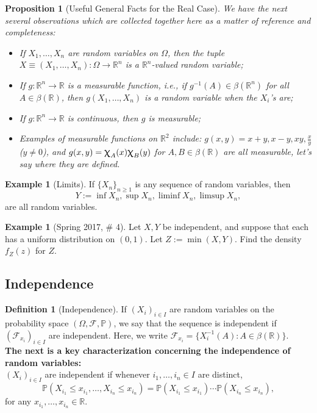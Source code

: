\documentclass[12pt,reqno]{article}
\theoremstyle{plain}
\newtheorem{prop}[theorem]{Proposition}
\theoremstyle{definition}
\newtheorem{definition}[theorem]{Definition}
\newtheorem{example}[theorem]{Example}
\newcommand{\PP}[1]{\ensuremath{\mathbb{P}\left(#1\right)}}
\renewcommand{\chi}{\scalebox{1.25}{$\upchi$}}
\begin{document}
\begin{prop}[Useful General Facts for the Real Case] 
We have the next several observations which are collected together here as a matter of 
reference and completeness:
\begin{itemize} 

\item[(1)] If $X_1,\ldots,X_n$ are random variables on $\Omega$, then the tuple 
     $X \equiv (X_1,\ldots,X_n): \Omega \rightarrow \mathbb{R}^n$ is a 
     $\mathbb{R}^n$-valued random variable; 
\item[(2)] If $g: \mathbb{R}^n \rightarrow \mathbb{R}$ is a measurable function, i.e., if 
     $g^{-1}(A) \in \beta(\mathbb{R}^n)$ for all $A \in \beta(\mathbb{R})$, then 
     $g(X_1,\ldots,X_n)$ is a random variable when the $X_i$'s are; 
\item[\textbf{(3)}] If $g: \mathbb{R}^n \rightarrow \mathbb{R}$ is continuous, then $g$ is measurable; 
\item[(4)] Examples of measurable functions on $\mathbb{R}^2$ include: 
     $g(x, y) = x+y, x-y, xy, \frac{x}{y}$ ($y \neq 0$), and $g(x, y) = \chi_A(x) \chi_B(y)$ for 
     $A,B \in \beta(\mathbb{R})$ are all measurable, let's say where they are defined. 

\end{itemize} 
\end{prop} 

\begin{example}[Limits] 
If $\{X_n\}_{n \geq 1}$ is any sequence of random variables, then 
$$Y := \inf X_n, \sup X_n, \liminf X_n, \limsup X_n,$$ are all 
random variables. 
\end{example} 

\begin{example}[Spring 2017, \# 4]
Let $X,Y$ be independent, and suppose that each has a uniform distribution 
on $(0,1)$. Let $Z := \min(X, Y)$. Find the density $f_Z(z)$ for $Z$. 
\end{example} 

\subsection{Independence} 

\begin{definition}[Independence] 
If $(X_i)_{i \in I}$ are random variables on the probability space 
$(\Omega, \mathcal{F}, \mathbb{P})$, we say that the sequence is independent 
if $(\mathcal{F}_{x_i})_{i \in I}$ are independent. Here, we write 
$\mathcal{F}_{x_i} = \{X_i^{-1}(A): A \in \beta(\mathbb{R})\}$. \\ 
\textbf{The next is a key characterization concerning the independence of 
random variables:} \\ 
$(X_i)_{i \in I}$ are independent if whenever $i_1,\ldots,i_n \in I$ are 
distinct, 
\[
\PP{X_{i_1} \leq x_{i_1},\ldots,X_{i_n} \leq x_{i_n}} = 
     \PP{X_{i_1} \leq x_{i_1}} \cdots \PP{X_{i_n} \leq x_{i_n}}, 
\]
for any $x_{i_1},\ldots,x_{i_n} \in \mathbb{R}$. 
\end{definition} 
\end{document}
